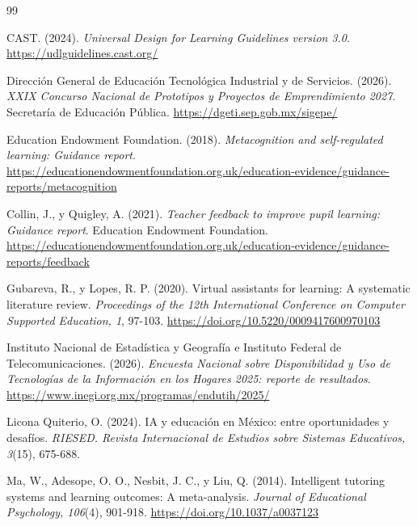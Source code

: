 \documentclass[11pt]{article}
\begin{document}
\clearpage

\begin{thebibliography}{99}
\fontsize{8.2}{10.2}\selectfont
\setlength{\itemsep}{2pt}

CAST. (2024). \textit{Universal Design for Learning Guidelines version 3.0}. \url{https://udlguidelines.cast.org/}

Dirección General de Educación Tecnológica Industrial y de Servicios. (2026). \textit{XXIX Concurso Nacional de Prototipos y Proyectos de Emprendimiento 2027}. Secretaría de Educación Pública. \url{https://dgeti.sep.gob.mx/sigepe/}

Education Endowment Foundation. (2018). \textit{Metacognition and self-regulated learning: Guidance report}. \url{https://educationendowmentfoundation.org.uk/education-evidence/guidance-reports/metacognition}

Collin, J., y Quigley, A. (2021). \textit{Teacher feedback to improve pupil learning: Guidance report}. Education Endowment Foundation. \url{https://educationendowmentfoundation.org.uk/education-evidence/guidance-reports/feedback}

Gubareva, R., y Lopes, R. P. (2020). Virtual assistants for learning: A systematic literature review. \textit{Proceedings of the 12th International Conference on Computer Supported Education, 1}, 97-103. \url{https://doi.org/10.5220/0009417600970103}

Instituto Nacional de Estadística y Geografía e Instituto Federal de Telecomunicaciones. (2026). \textit{Encuesta Nacional sobre Disponibilidad y Uso de Tecnologías de la Información en los Hogares 2025: reporte de resultados}. \url{https://www.inegi.org.mx/programas/endutih/2025/}

Licona Quiterio, O. (2024). IA y educación en México: entre oportunidades y desafíos. \textit{RIESED. Revista Internacional de Estudios sobre Sistemas Educativos, 3}(15), 675-688.

Ma, W., Adesope, O. O., Nesbit, J. C., y Liu, Q. (2014). Intelligent tutoring systems and learning outcomes: A meta-analysis. \textit{Journal of Educational Psychology, 106}(4), 901-918. \url{https://doi.org/10.1037/a0037123}


\end{thebibliography}
\end{document}
